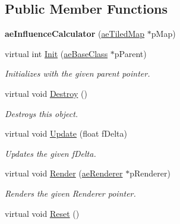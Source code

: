 \subsection*{Public Member Functions}
\begin{DoxyCompactItemize}
\item 
{\bfseries ae\+Influence\+Calculator} (\hyperlink{classae_tiled_map}{ae\+Tiled\+Map} $\ast$p\+Map)\hypertarget{classae_influence_calculator_aef49d51bfbef33de2603e69a2dac091c}{}\label{classae_influence_calculator_aef49d51bfbef33de2603e69a2dac091c}

\item 
virtual int \hyperlink{classae_influence_calculator_ab2607b3e3750770bb23d7e8c4610a49c}{Init} (\hyperlink{classae_base_class}{ae\+Base\+Class} $\ast$p\+Parent)
\begin{DoxyCompactList}\small\item\em Initializes with the given parent pointer. \end{DoxyCompactList}\item 
virtual void \hyperlink{classae_influence_calculator_a83e784eea5912b82a7ebfe80373f6c2e}{Destroy} ()\hypertarget{classae_influence_calculator_a83e784eea5912b82a7ebfe80373f6c2e}{}\label{classae_influence_calculator_a83e784eea5912b82a7ebfe80373f6c2e}

\begin{DoxyCompactList}\small\item\em Destroys this object. \end{DoxyCompactList}\item 
virtual void \hyperlink{classae_influence_calculator_af1e3be3558a8e0e0638959ca41734abd}{Update} (float f\+Delta)
\begin{DoxyCompactList}\small\item\em Updates the given f\+Delta. \end{DoxyCompactList}\item 
virtual void \hyperlink{classae_influence_calculator_a9c48a833f9f81303ec212a9a17d83920}{Render} (\hyperlink{classae_core_1_1ae_renderer}{ae\+Renderer} $\ast$p\+Renderer)
\begin{DoxyCompactList}\small\item\em Renders the given Renderer pointer. \end{DoxyCompactList}\item 
virtual void \hyperlink{classae_influence_calculator_a78c17fcba2c67a0e62edd2b8a123a825}{Reset} ()\hypertarget{classae_influence_calculator_a78c17fcba2c67a0e62edd2b8a123a825}{}\label{classae_influence_calculator_a78c17fcba2c67a0e62edd2b8a123a825}


\end{DoxyCompactItemize}
